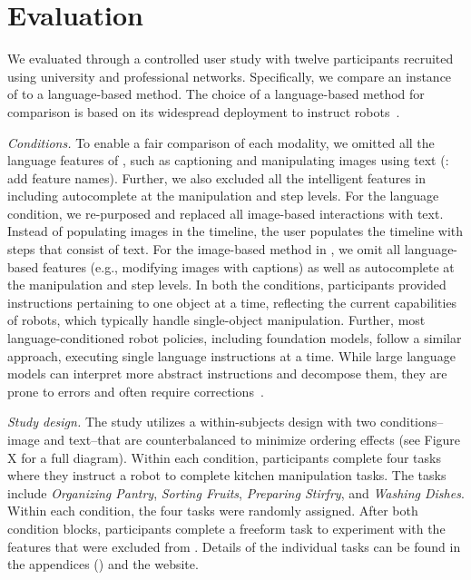 \section{Evaluation}
We evaluated \projname through a controlled user study with twelve participants recruited using university and professional networks. Specifically, we compare an instance of \projname to a language-based method. The choice of a language-based method for comparison is based on its widespread deployment to instruct robots~\cite{team2024octo, zha2023distilling}.

\emph{Conditions.} To enable a fair comparison of each modality, we omitted all the language features of \projname, such as captioning and manipulating images using text (\mk: add feature names). Further, we also excluded all the intelligent features in \projname including autocomplete at the manipulation and step levels. For the language condition, we re-purposed \projname and replaced all image-based interactions with text. Instead of populating images in the timeline, the user populates the timeline with steps that consist of text. For the image-based method in \projname, we omit all language-based features (e.g., modifying images with captions) as well as autocomplete at the manipulation and step levels. In both the conditions, participants provided instructions pertaining to one object at a time, reflecting the current capabilities of robots, which typically handle single-object manipulation. Further, most language-conditioned robot policies, including foundation models, follow a similar approach, executing single language instructions at a time. While large language models can interpret more abstract instructions and decompose them, they are prone to errors and often require corrections~\cite{zha2023distilling}.

\emph{Study design.} The study utilizes a within-subjects design with two conditions--image and text--that are counterbalanced to minimize ordering effects (see Figure X for a full diagram). Within each condition, participants complete four tasks where they instruct a robot to complete kitchen manipulation tasks. The tasks include \textit{Organizing Pantry}, \textit{Sorting Fruits}, \textit{Preparing Stirfry}, and \textit{Washing Dishes}. Within each condition, the four tasks were randomly assigned. After both condition blocks, participants complete a freeform task to experiment with the features that were excluded from \projname. Details of the individual tasks can be found in the appendices () and the website.

